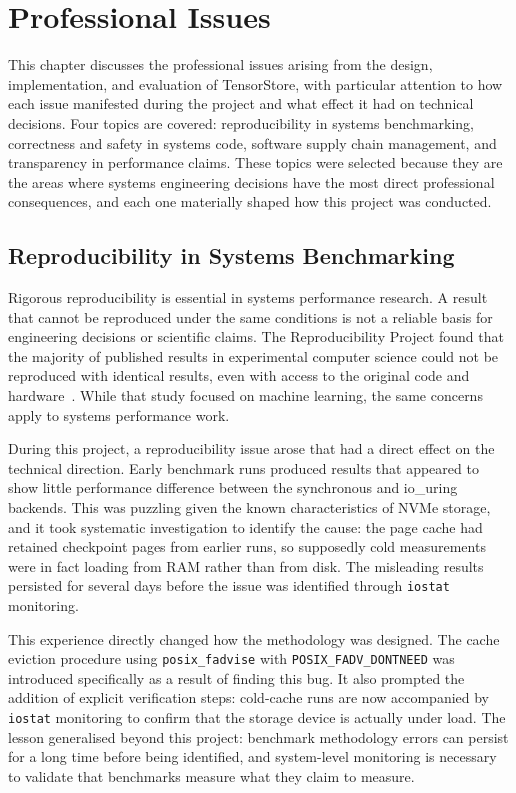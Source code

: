 \chapter{Professional Issues}
\label{chap:professional_issues}

This chapter discusses the professional issues arising from the design, implementation, and evaluation of TensorStore, with particular attention to how each issue manifested during the project and what effect it had on technical decisions. Four topics are covered: reproducibility in systems benchmarking, correctness and safety in systems code, software supply chain management, and transparency in performance claims. These topics were selected because they are the areas where systems engineering decisions have the most direct professional consequences, and each one materially shaped how this project was conducted.

\section{Reproducibility in Systems Benchmarking}

Rigorous reproducibility is essential in systems performance research. A result that cannot be reproduced under the same conditions is not a reliable basis for engineering decisions or scientific claims. The Reproducibility Project found that the majority of published results in experimental computer science could not be reproduced with identical results, even with access to the original code and hardware~\cite{reproducibility2015}. While that study focused on machine learning, the same concerns apply to systems performance work.

During this project, a reproducibility issue arose that had a direct effect on the technical direction. Early benchmark runs produced results that appeared to show little performance difference between the synchronous and io\_uring backends. This was puzzling given the known characteristics of NVMe storage, and it took systematic investigation to identify the cause: the page cache had retained checkpoint pages from earlier runs, so supposedly cold measurements were in fact loading from RAM rather than from disk. The misleading results persisted for several days before the issue was identified through \texttt{iostat} monitoring.

This experience directly changed how the methodology was designed. The cache eviction procedure using \texttt{posix\_fadvise} with \texttt{POSIX\_FADV\_DONTNEED} was introduced specifically as a result of finding this bug. It also prompted the addition of explicit verification steps: cold-cache runs are now accompanied by \texttt{iostat} monitoring to confirm that the storage device is actually under load. The lesson generalised beyond this project: benchmark methodology errors can persist for a long time before being identified, and system-level monitoring is necessary to validate that benchmarks measure what they claim to measure.

